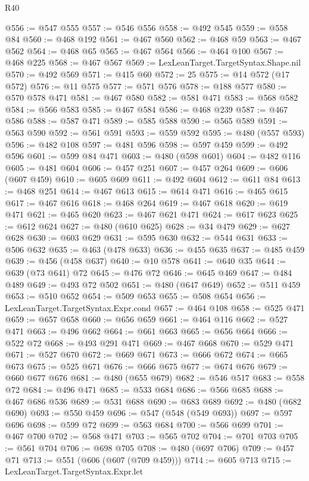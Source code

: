 \begin{lexlean}{R40}
\begin{coremodule}
@556 := @547 @555
@557 := @546 @556
@558 := @492 @545
@559 := @558 @84
@560 := @468 @192
@561 := @467 @560
@562 := @468 @59
@563 := @467 @562
@564 := @468 @65
@565 := @467 @564
@566 := @464 @100
@567 := @468 @225
@568 := @467 @567
@569 := LexLeanTarget.TargetSyntax.Shape.nil
@570 := @492 @569
@571 := @415 @60
@572 := 25
@575 := @14 @572 (@17 @572)
@576 := @11 @575
@577 := @571 @576
@578 := @188 @577
@580 := @570 @578 @471
@581 := @467 @580
@582 := @581 @471
@583 := @568 @582
@584 := @566 @583
@585 := @467 @584
@586 := @468 @239
@587 := @467 @586
@588 := @587 @471
@589 := @585 @588
@590 := @565 @589
@591 := @563 @590
@592 := @561 @591
@593 := @559 @592
@595 := @480 (@557 @593)
@596 := @482 @108
@597 := @481 @596
@598 := @597 @459
@599 := @492 @596
@601 := @599 @84 @471
@603 := @480 (@598 @601)
@604 := @482 @116
@605 := @481 @604
@606 := @457 @251
@607 := @457 @264
@609 := @606 (@607 @459)
@610 := @605 @609
@611 := @492 @604
@612 := @611 @84
@613 := @468 @251
@614 := @467 @613
@615 := @614 @471
@616 := @465 @615
@617 := @467 @616
@618 := @468 @264
@619 := @467 @618
@620 := @619 @471
@621 := @465 @620
@623 := @467 @621 @471
@624 := @617 @623
@625 := @612 @624
@627 := @480 (@610 @625)
@628 := @34 @479
@629 := @627 @628
@630 := @603 @629
@631 := @595 @630
@632 := @544 @631
@633 := @506 @632
@635 := @463 (@478 @633)
@636 := @455 @635
@637 := @485 @459
@639 := @456 (@458 @637)
@640 := @10 @578
@641 := @640 @35
@644 := @639 (@73 @641) @72
@645 := @476 @72
@646 := @645 @469
@647 := @484 @489
@649 := @493 @72 @502
@651 := @480 (@647 @649)
@652 := @511 @459
@653 := @510 @652
@654 := @509 @653
@655 := @508 @654
@656 := LexLeanTarget.TargetSyntax.Expr.cond
@657 := @464 @108
@658 := @525 @471
@659 := @657 @658
@660 := @656 @659
@661 := @464 @116
@662 := @527 @471
@663 := @496 @662
@664 := @661 @663
@665 := @656 @664
@666 := @522 @72
@668 := @493 @291 @471
@669 := @467 @668
@670 := @529 @471
@671 := @527 @670
@672 := @669 @671
@673 := @666 @672
@674 := @665 @673
@675 := @525 @671
@676 := @666 @675
@677 := @674 @676
@679 := @660 @677 @676
@681 := @480 (@655 @679)
@682 := @546 @517
@683 := @558 @72
@684 := @496 @471
@685 := @533 @684
@686 := @566 @685
@688 := @467 @686 @536
@689 := @531 @688
@690 := @683 @689
@692 := @480 (@682 @690)
@693 := @550 @459
@696 := @547 (@548 (@549 @693))
@697 := @597 @696
@698 := @599 @72
@699 := @563 @684
@700 := @566 @699
@701 := @467 @700
@702 := @568 @471
@703 := @565 @702
@704 := @701 @703
@705 := @561 @704
@706 := @698 @705
@708 := @480 (@697 @706)
@709 := @457 @71
@713 := @551 (@606 (@607 (@709 @459)))
@714 := @605 @713
@715 := LexLeanTarget.TargetSyntax.Expr.let

\end{coremodule}
\end{lexlean}
